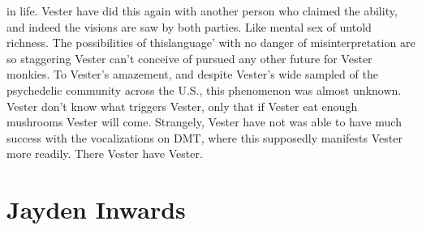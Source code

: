 \documentclass[12pt]{book}
\begin{document}
in life. Vester have did this again with another person who claimed the ability, and indeed the visions are saw by both parties. Like mental sex of untold richness. The possibilities of thislanguage' with no danger of misinterpretation are so staggering Vester can't conceive of pursued any other future for Vester monkies. To Vester's amazement, and despite Vester's wide sampled of the psychedelic community across the U.S., this phenomenon was almost unknown. Vester don't know what triggers Vester, only that if Vester eat enough mushrooms Vester will come. Strangely, Vester have not was able to have much success with the vocalizations on DMT, where this supposedly manifests Vester more readily. There Vester have Vester.



\chapter{Jayden Inwards}
\end{document}
